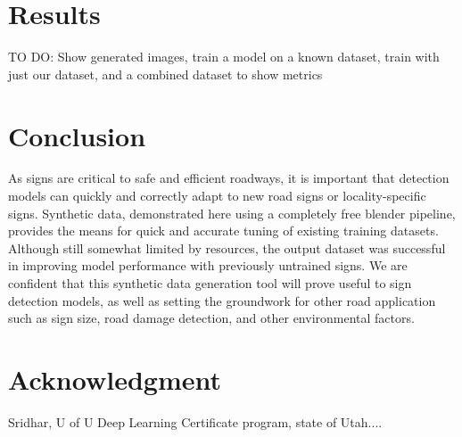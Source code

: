 \documentclass[journal]{IEEEtran}
\begin{document}
\section{Results}
TO DO: Show generated images, train a model on a known dataset, train with just our dataset, and a combined dataset to show metrics

\section{Conclusion}
As signs are critical to safe and efficient roadways, it is important that detection models can quickly and correctly adapt to new road signs or locality-specific signs. Synthetic data, demonstrated here using a completely free blender pipeline, provides the means for quick and accurate tuning of existing training datasets. Although still somewhat limited by resources, the output dataset was successful in improving model performance with previously untrained signs. We are confident that this synthetic data generation tool will prove useful to sign detection models, as well as setting the groundwork for other road application such as sign size, road damage detection, and other environmental factors. 



\section*{Acknowledgment}


Sridhar, U of U Deep Learning Certificate program, state of Utah.... 


\ifCLASSOPTIONcaptionsoff
  \newpage
\fi





%
%
%
\end{document}
